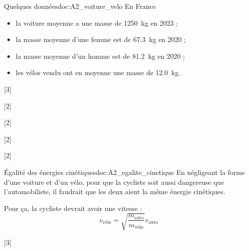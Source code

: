 \begin{doc}{Quelques données}{doc:A2_voiture_velo}
  En France 
  \begin{itemize}
      \item la voiture moyenne a une masse de \qty{1 250}{\kg} en 2023 ;
      \item la masse moyenne d'une femme est de \qty{67,3}{\kg} en 2020 ;
      \item la masse moyenne d'un homme est de \qty{81,2}{\kg} en 2020 ;
      \item les vélos vendu ont en moyenne une masse de \qty{12,0}{\kg}.
  \end{itemize}
\end{doc}

[3]

[2]

[2]

[2]

[2]

\begin{doc}{Égalité des énergies cinétiques}{doc:A2_egalite_cinetique}
  En négligeant la forme d'une voiture et d'un vélo, pour que la cycliste soit aussi dangereuse que l'automobiliste, il faudrait que les deux aient la même énergie cinétiques.
  
  Pour ça, la cycliste devrait avoir une vitesse :
  \begin{equation*}
    v_\text{vélo} = \sqrt{\dfrac{m_\text{auto}}{m_\text{vélo}}} v_\text{auto}
  \end{equation*}
\end{doc}

[3]

